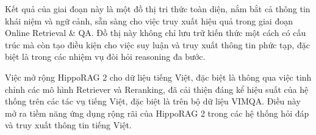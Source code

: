 Kết quả của giai đoạn này là một đồ thị tri thức toàn diện, nắm bắt cả thông tin khái niệm và ngữ cảnh, sẵn sàng cho việc truy xuất hiệu quả trong giai đoạn Online Retrieval & QA. Đồ thị này không chỉ lưu trữ kiến thức một cách có cấu trúc mà còn tạo điều kiện cho việc suy luận và truy xuất thông tin phức tạp, đặc biệt là trong các nhiệm vụ đòi hỏi reasoning đa bước.

Việc mở rộng HippoRAG 2 cho dữ liệu tiếng Việt, đặc biệt là thông qua việc tinh chỉnh các mô hình Retriever và Reranking, đã cải thiện đáng kể hiệu suất của hệ thống trên các tác vụ tiếng Việt, đặc biệt là trên bộ dữ liệu VIMQA. Điều này mở ra tiềm năng ứng dụng rộng rãi của HippoRAG 2 trong các hệ thống hỏi đáp và truy xuất thông tin tiếng Việt.
